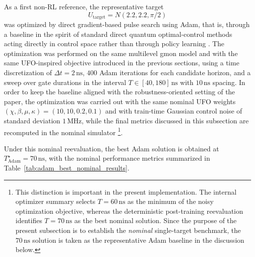 As a first non-RL reference, the representative target
\begin{equation}
U_{\mathrm{target}} = N(2.2,2.2,\pi/2)
\label{eq:adam_representative_target}
\end{equation}
was optimized by direct gradient-based pulse search using Adam, that is, through a baseline in the spirit of standard direct quantum optimal-control methods acting directly in control space rather than through policy learning \cite{Khaneja2005,Koch2022}.
The optimization was performed on the same multilevel gmon model and with the same UFO-inspired objective introduced in the previous sections, using a time discretization of \(\Delta t = 2\,\mathrm{ns}\), \(400\) Adam iterations for each candidate horizon, and a sweep over gate durations in the interval \(T\in[40,180]\,\mathrm{ns}\) with \(10\,\mathrm{ns}\) spacing.
In order to keep the baseline aligned with the robustness-oriented setting of the paper, the optimization was carried out with the same nominal UFO weights \((\chi,\beta,\mu,\kappa)=(10,10,0.2,0.1)\) and with train-time Gaussian control noise of standard deviation \(1\,\mathrm{MHz}\), while the final metrics discussed in this subsection are recomputed in the nominal simulator
\footnote{This distinction is important in the present implementation. The internal optimizer summary selects \(T=60\,\mathrm{ns}\) as the minimum of the noisy optimization objective, whereas the deterministic post-training reevaluation identifies \(T=70\,\mathrm{ns}\) as the best nominal solution. Since the purpose of the present subsection is to establish the \emph{nominal} single-target benchmark, the \(70\,\mathrm{ns}\) solution is taken as the representative Adam baseline in the discussion below.}.

Under this nominal reevaluation, the best Adam solution is obtained at \(T_{\mathrm{Adam}}^{\star}=70\,\mathrm{ns}\), with the nominal performance metrics summarized in Table~\ref{tab:adam_best_nominal_results}.

